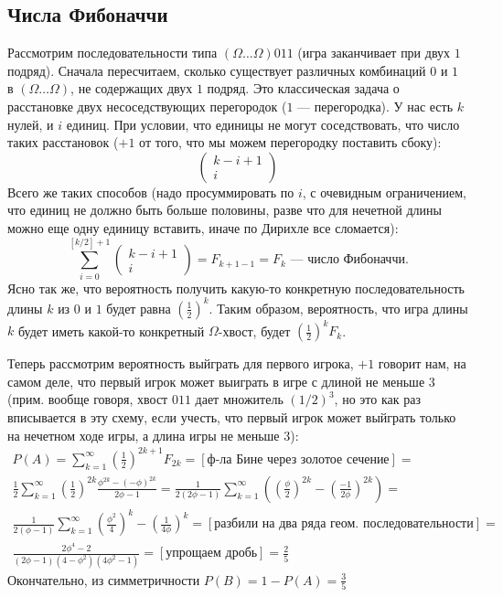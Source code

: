 \subsection*{Числа Фибоначчи}
Рассмотрим последовательности типа $(\Omega\ldots\Omega)011$ (игра заканчивает при двух $1$ подряд).
Сначала пересчитаем, сколько существует различных комбинаций $0$ и $1$ в $(\Omega\ldots\Omega)$, не содержащих двух $1$ подряд.
Это классическая задача о расстановке двух несоседствующих перегородок ($1$ --- перегородка). У нас есть $k$ нулей, и $i$ единиц.
При условии, что единицы не могут соседствовать, что число таких расстановок ($+1$ от того, что мы можем перегородку поставить сбоку):
\begin{equation}
    \begin{pmatrix}
        k - i + 1 \\
        i
    \end{pmatrix}
\end{equation}
Всего же таких способов (надо просуммировать по $i$, с очевидным ограничением, что  единиц не должно быть больше половины, разве что для нечетной длины можно еще одну единицу вставить, иначе по Дирихле все сломается):
\begin{equation}
    \sum\limits_{i = 0}^{[k / 2] + 1}
    \begin{pmatrix}
        k - i + 1 \\
        i
    \end{pmatrix} = F_{k + 1 - 1} = F_{k} \text{ --- число Фибоначчи.}
\end{equation}
Ясно так же, что вероятность получить какую-то конкретную последовательность длины $k$ из $0$ и $1$ будет равна $\left(\frac{1}{2}\right)^{k}$. Таким образом, вероятность, что игра длины $k$ будет иметь какой-то конкретный $\Omega$-хвост, будет $\left(\frac{1}{2}\right)^{k}F_k$.

Теперь рассмотрим вероятность выйграть для первого игрока, $+1$ говорит нам, на самом деле, что первый игрок может выиграть в игре с длиной не меньше $3$ (прим. вообще говоря, хвост $011$ дает множитель $(1/2)^3$, но это как раз вписывается в эту схему, если учесть, что первый игрок может выйграть только на нечетном ходе игры, а длина игры не меньше $3$):
\begin{gather}
    P(A) = \sum\limits_{k = 1}^{\infty}\left(\frac{1}{2}\right)^{2k+1}F_{2k} = [\text{ф-ла Бине через золотое сечение}] = \\ \frac12\sum\limits_{k=1}^{\infty}\left(\frac{1}{2}\right)^{2k}\frac{\phi^{2k} - (-\phi)^{2k}}{2\phi - 1} = \frac{1}{2(2\phi - 1)}\sum\limits_{k=1}^{\infty}\left(\left(\frac{\phi}{2}\right)^{2k} - \left(\frac{-1}{2\phi}\right)^{2k}\right) = \\
    \frac{1}{2(\phi - 1)} \sum\limits_{k=1}^{\infty} \left(\frac{\phi^2}{4}\right)^k - \left(\frac{1}{4\phi}\right)^k = [\text{разбили на два ряда геом. последовательности}] = \\ \frac{2\phi^4 - 2}{(2\phi - 1)(4 - \phi^2)(4\phi^2 - 1)} = [\text{упрощаем дробь}] = \frac{2}{5}
\end{gather}
Окончательно, из симметричности $P(B) = 1 - P(A) = \frac35$